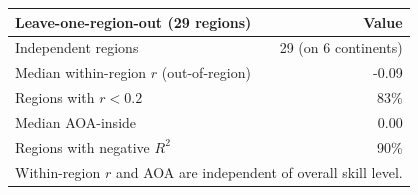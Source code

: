 \begin{tabular}{lr}
\toprule
Leave-one-region-out (29 regions) & Value \\
\midrule
Independent regions & 29 (on 6 continents) \\
Median within-region $r$ (out-of-region) & -0.09 \\
Regions with $r<0.2$ & 83\% \\
Median AOA-inside & 0.00 \\
Regions with negative $R^2$ & 90\% \\
\bottomrule
\multicolumn{2}{l}{\footnotesize Within-region $r$ and AOA are independent of overall skill level.}\\
\end{tabular}
